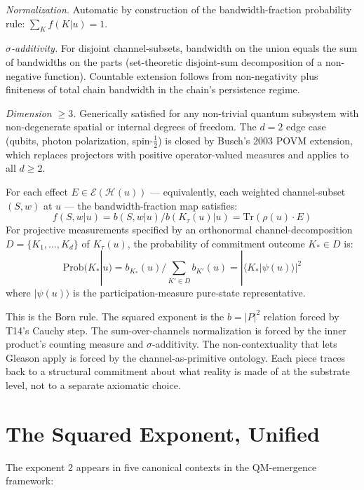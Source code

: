 \documentclass[11pt,a4paper]{article}
\begin{document}
\emph{Normalization.} Automatic by construction of the bandwidth-fraction probability rule: $\sum_K f(K|u) = 1$.

\emph{$\sigma$-additivity.} For disjoint channel-subsets, bandwidth on the union equals the sum of bandwidths on the parts (set-theoretic disjoint-sum decomposition of a non-negative function). Countable extension follows from non-negativity plus finiteness of total chain bandwidth in the chain's persistence regime.

\emph{Dimension $\geq 3$.} Generically satisfied for any non-trivial quantum subsystem with non-degenerate spatial or internal degrees of freedom. The $d = 2$ edge case (qubits, photon polarization, spin-$\tfrac{1}{2}$) is closed by Busch's 2003 POVM extension, which replaces projectors with positive operator-valued measures and applies to all $d \geq 2$.

For each effect $E \in \mathcal{E}(\mathcal{H}(u))$ --- equivalently, each weighted channel-subset $(S, w)$ at $u$ --- the bandwidth-fraction map satisfies:
\[
f(S, w | u) = b(S, w | u) / b(K_\tau(u) | u) = \mathrm{Tr}(\rho(u) \cdot E)
\]
For projective measurements specified by an orthonormal channel-decomposition $D = \{K_1, \ldots, K_d\}$ of $K_\tau(u)$, the probability of commitment outcome $K_* \in D$ is:
\[
\mathrm{Prob}(K_* | u) = b_{K_*}(u) / \sum_{K' \in D} b_{K'}(u) = |\langle K_*|\psi(u)\rangle|^{2}
\]
where $|\psi(u)\rangle$ is the participation-measure pure-state representative.

This is the Born rule. The squared exponent is the $b = |P|^2$ relation forced by T14's Cauchy step. The sum-over-channels normalization is forced by the inner product's counting measure and $\sigma$-additivity. The non-contextuality that lets Gleason apply is forced by the channel-as-primitive ontology. Each piece traces back to a structural commitment about what reality is made of at the substrate level, not to a separate axiomatic choice.

\section{The Squared Exponent, Unified}

The exponent 2 appears in five canonical contexts in the QM-emergence framework:
\end{document}
